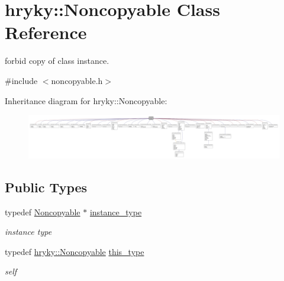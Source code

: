 \hypertarget{classhryky_1_1_noncopyable}{\section{hryky\-:\-:Noncopyable Class Reference}
\label{classhryky_1_1_noncopyable}
}


forbid copy of class instance.  




{\ttfamily \#include $<$noncopyable.\-h$>$}



Inheritance diagram for hryky\-:\-:Noncopyable\-:
\nopagebreak
\begin{figure}[H]
\begin{center}
\leavevmode
\includegraphics[width=350pt]{classhryky_1_1_noncopyable__inherit__graph}
\end{center}
\end{figure}
\subsection*{Public Types}
\begin{DoxyCompactItemize}
\item 
\hypertarget{classhryky_1_1_noncopyable_aaf87abb55f700af85ecb0895f6178821}{typedef \hyperlink{classhryky_1_1_noncopyable}{Noncopyable} $\ast$ \hyperlink{classhryky_1_1_noncopyable_aaf87abb55f700af85ecb0895f6178821}{instance\-\_\-type}}\label{classhryky_1_1_noncopyable_aaf87abb55f700af85ecb0895f6178821}

\begin{DoxyCompactList}\small\item\em instance type \end{DoxyCompactList}\item 
\hypertarget{classhryky_1_1_noncopyable_acf13ad1c98a76247a561dff514979da5}{typedef \hyperlink{classhryky_1_1_noncopyable}{hryky\-::\-Noncopyable} \hyperlink{classhryky_1_1_noncopyable_acf13ad1c98a76247a561dff514979da5}{this\-\_\-type}}\label{classhryky_1_1_noncopyable_acf13ad1c98a76247a561dff514979da5}

\begin{DoxyCompactList}\small\item\em self \end{DoxyCompactList}\end{DoxyCompactItemize}
